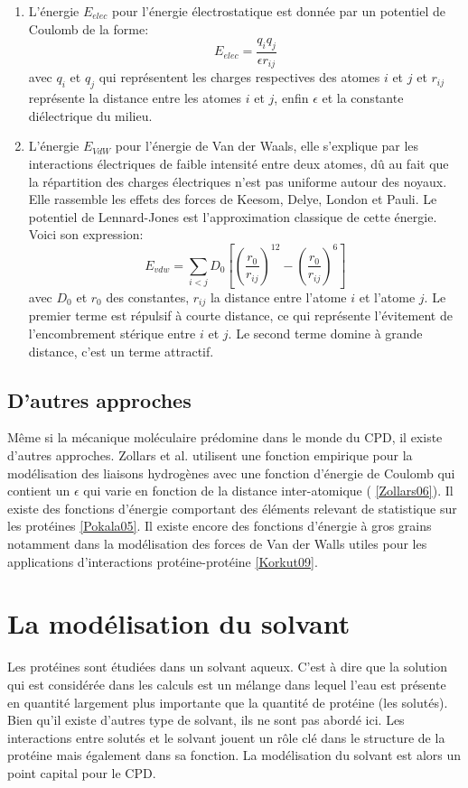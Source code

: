\begin{enumerate}
  \label{VdW}
\item L'énergie $E_{elec}$ pour l'énergie électrostatique est donnée par un potentiel de Coulomb de la forme:
  \begin{equation}
    E_{elec}=\frac{q_iq_j}{\epsilon r_{ij}}
  \end{equation}
  avec $q_i$ et $q_j$ qui représentent les charges respectives des atomes $i$ et $j$ et $r_{ij}$ représente la distance entre les atomes $i$ et $j$, enfin $\epsilon$ et la constante diélectrique du milieu.
\item L'énergie  $E_{VdW}$ pour l'énergie de Van der Waals, elle s'explique par les interactions électriques de faible intensité entre deux atomes, dû au fait que la répartition des charges électriques n'est pas uniforme autour des noyaux. Elle rassemble les effets des forces de Keesom, Delye, London et Pauli. Le potentiel de Lennard-Jones est l'approximation classique de cette énergie. Voici son expression:
  \begin{equation}
  E_{vdw} = \sum_{i<j}D_0 [(\frac{r_0}{r_{ij}})^12 - (\frac{r_0}{r_{ij}})^6]  
  \end{equation}
avec $D_0$ et $r_0$ des constantes, $r_{ij}$ la distance entre l'atome $i$ et l'atome $j$. Le premier terme est répulsif à courte distance, ce qui représente l'évitement de l'encombrement stérique entre $i$ et $j$. Le second terme domine à grande distance, c'est un terme attractif. 
  
\end{enumerate}


\subsection{D'autres approches}

Même si la mécanique moléculaire prédomine dans le monde du CPD, il existe d'autres approches. Zollars et al. utilisent une fonction empirique pour la modélisation des liaisons hydrogènes avec une fonction d'énergie de Coulomb qui contient un $\epsilon$ qui varie en fonction de la distance inter-atomique ( \ref{Zollars06}). Il existe des fonctions d'énergie comportant des éléments relevant de statistique sur les protéines \ref{Pokala05}. Il existe encore des fonctions d'énergie à gros grains notamment dans la modélisation des forces de Van der Walls utiles pour les applications d'interactions protéine-protéine \ref{Korkut09}.

\section{La modélisation du solvant}
Les protéines sont étudiées dans un solvant aqueux. C'est à dire que la solution qui est considérée dans les calculs est un mélange dans lequel l'eau est présente en quantité largement plus importante que la quantité de protéine (les solutés). Bien qu'il existe d'autres type de solvant, ils ne sont pas abordé ici. Les interactions entre solutés et le solvant jouent un rôle clé dans le structure de la protéine mais également dans sa fonction. La modélisation du solvant est alors un point capital pour le CPD.

